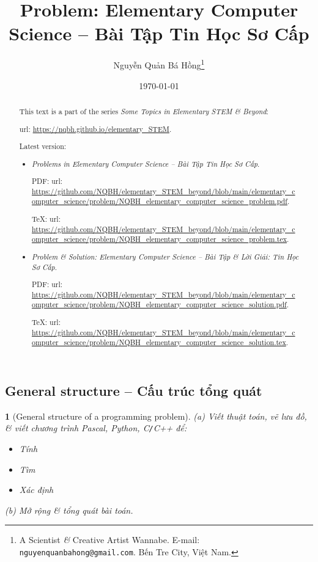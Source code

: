 \documentclass{article}
\title{Problem: Elementary Computer Science -- Bài Tập Tin Học Sơ Cấp}
\author{Nguyễn Quản Bá Hồng\footnote{A Scientist {\it\&} Creative Artist Wannabe. E-mail: {\tt nguyenquanbahong@gmail.com}. Bến Tre City, Việt Nam.}}
\date{\today}
\newtheorem{baitoan}{}
\begin{document}
	\maketitle
\begin{abstract}
	This text is a part of the series {\it Some Topics in Elementary STEM \& Beyond}:
	
	{\sc url}: \url{https://nqbh.github.io/elementary_STEM}.
	
	Latest version:
	\begin{itemize}
		\item {\it Problems in Elementary Computer Science -- Bài Tập Tin Học Sơ Cấp}.
		
		PDF: {\sc url}: \url{https://github.com/NQBH/elementary_STEM_beyond/blob/main/elementary_computer_science/problem/NQBH_elementary_computer_science_problem.pdf}.
		
		\TeX: {\sc url}: \url{https://github.com/NQBH/elementary_STEM_beyond/blob/main/elementary_computer_science/problem/NQBH_elementary_computer_science_problem.tex}.
		\item {\it Problem \& Solution: Elementary Computer Science -- Bài Tập \& Lời Giải: Tin Học Sơ Cấp}.
		
		PDF: {\sc url}: \url{https://github.com/NQBH/elementary_STEM_beyond/blob/main/elementary_computer_science/problem/NQBH_elementary_computer_science_solution.pdf}.
		
		\TeX: {\sc url}: \url{https://github.com/NQBH/elementary_STEM_beyond/blob/main/elementary_computer_science/problem/NQBH_elementary_computer_science_solution.tex}.
	\end{itemize}
\end{abstract}
\tableofcontents


\subsection*{General structure -- Cấu trúc tổng quát}

\begin{baitoan}[General structure of a programming problem]
	(a) Viết thuật toán, vẽ lưu đồ, \& viết chương trình {\sf Pascal, Python, C{\tt/}C++} để:
	\begin{itemize}
		\item Tính
		\item Tìm
		\item Xác định
	\end{itemize}
	(b) Mở rộng \& tổng quát bài toán.
\end{baitoan}
\end{document}

